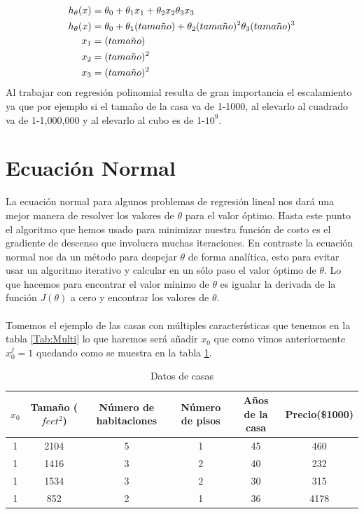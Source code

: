 \documentclass{report}
\begin{document}
\begin{align}
\notag
h_\theta(x)&=\theta_0+\theta_1x_1+\theta_2x_2\theta_3x_3\\
h_\theta(x)&=\theta_0+\theta_1(tama\tilde{n}o)+\theta_2(tama\tilde{n}o)^2\theta_3(tama\tilde{n}o)^3\label{Eq:RP}\\\notag
x_1&=(tama\tilde{n}o)\\\notag
x_2&=(tama\tilde{n}o)^2\\\notag
x_3&=(tama\tilde{n}o)^2
\end{align}
Al trabajar con regresión polinomial resulta de gran importancia el escalamiento ya que por ejemplo si el tamaño de la casa va de 1-1000, al elevarlo al cuadrado va de 1-1,000,000 y al elevarlo al cubo es de 1-$10^9$.
\section{Ecuación Normal}
La ecuación normal para algunos problemas de regresión lineal nos dará una mejor manera de resolver los valores de $\theta$ para el valor óptimo. Hasta este punto el algoritmo que hemos usado para minimizar nuestra función de costo es el gradiente de descenso que involucra muchas iteraciones. En contraste la ecuación normal nos da un método para despejar $\theta$ de forma analítica, esto para evitar usar un algoritmo iterativo y calcular en un sólo paso el valor óptimo de $\theta$. Lo que hacemos para encontrar el valor mínimo de $\theta$ es igualar la derivada de la función $J(\theta)$ a cero y encontrar los valores de $\theta$.\\\\Tomemos el ejemplo de las casas con múltiples características que tenemos en la tabla \ref{Tab:Multi} lo que haremos será añadir $x_0$ que como vimos anteriormente $x_0^j=1$ quedando como se muestra en la tabla \ref{Tab:Multi2}.
\begin{table}[h]
	\begin{tabular}{|c|c|c|c|c||c|}
		\hline
		$x_0$&Tamaño ($feet^2$) & Número de habitaciones & Número de pisos&Años de la casa&Precio(\$1000)\\
		\hline
		\hline
		1&2104&5&1&45&460\\
		1&1416&3&2&40&232\\
		1&1534&3&2&30&315\\
		1&852&2&1&36&4178\\
		\hline	
	\end{tabular}
	\caption{Datos de casas}
	\label{Tab:Multi2}
\end{table}
\end{document}
